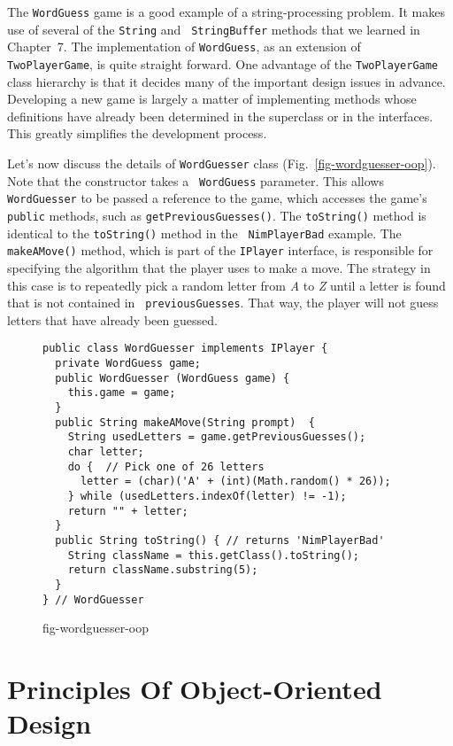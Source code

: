 The {\tt WordGuess} game is a good example of a string-processing
problem.  It makes use of several of the {\tt String} and {\tt
StringBuffer} methods that we learned in Chapter~7.  The
implementation of {\tt WordGuess}, as an extension of {\tt
TwoPlayerGame}, is quite straight forward. One advantage of
the {\tt TwoPlayerGame} class hierarchy is that it decides many
of the important design issues in advance. Developing a new game
is largely a matter of implementing methods whose definitions have
already been determined in the superclass or in the interfaces.  This
greatly simplifies the development process.

Let's now discuss the details of {\tt WordGuesser} class
(Fig.~\ref{fig-wordguesser-oop}). Note that the constructor takes a {\tt
WordGuess} parameter. This allows {\tt WordGuesser} to be passed a
reference to the game, which accesses the game's {\tt public}
methods, such as {\tt getPreviousGuesses()}.  The {\tt toString()}
method is identical to the {\tt toString()} method in the {\tt
NimPlayerBad} example.  The {\tt makeAMove()} method, which is part of
the {\tt IPlayer} interface, is responsible for specifying the
algorithm that the player uses to make a move.  The strategy in this
case is to repeatedly pick a random letter from {\em A} to {\em Z}
until a letter is found that is not contained in {\tt
previousGuesses}.  That way, the player will not guess letters that
have already been guessed. 

\begin{figure}[t]
\jjjprogstart
\begin{jjjlisting}
\begin{lstlisting}
public class WordGuesser implements IPlayer {   
  private WordGuess game;
  public WordGuesser (WordGuess game) {   
    this.game = game;
  }
  public String makeAMove(String prompt)  {   
    String usedLetters = game.getPreviousGuesses();
    char letter;
    do {  // Pick one of 26 letters
      letter = (char)('A' + (int)(Math.random() * 26));
    } while (usedLetters.indexOf(letter) != -1);
    return "" + letter;
  }
  public String toString() { // returns 'NimPlayerBad'
    String className = this.getClass().toString(); 
    return className.substring(5);        
  }
} // WordGuesser
\end{lstlisting}
\end{jjjlisting}
{fig-wordguesser-oop}
\end{figure}

\section{Principles Of Object-Oriented Design}

